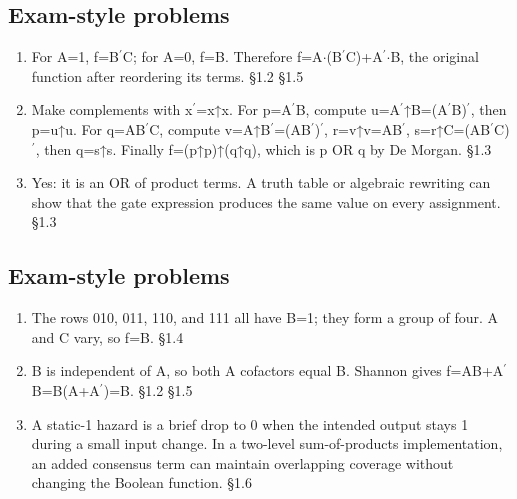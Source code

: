 \documentclass[11pt]{article}
\begin{document}
\begin{keepsection}\subsection{Exam-style problems}

\begin{enumerate}
\item For A=1, f=B\ensuremath{{}^{\prime}}C; for A=0, f=B. Therefore f=A\ensuremath{\cdot}(B\ensuremath{{}^{\prime}}C)+A\ensuremath{{}^{\prime}}\ensuremath{\cdot}B, the original function after reordering its terms. \hfill{\small\color{FAUblue}§1.2} \hfill{\small\color{FAUblue}§1.5}
\item Make complements with x\ensuremath{{}^{\prime}}=x↑x. For p=A\ensuremath{{}^{\prime}}B, compute u=A\ensuremath{{}^{\prime}}↑B=(A\ensuremath{{}^{\prime}}B)\ensuremath{{}^{\prime}}, then p=u↑u. For q=AB\ensuremath{{}^{\prime}}C, compute v=A↑B\ensuremath{{}^{\prime}}=(AB\ensuremath{{}^{\prime}})\ensuremath{{}^{\prime}}, r=v↑v=AB\ensuremath{{}^{\prime}}, s=r↑C=(AB\ensuremath{{}^{\prime}}C)\ensuremath{{}^{\prime}}, then q=s↑s. Finally f=(p↑p)↑(q↑q), which is p OR q by De Morgan. \hfill{\small\color{FAUblue}§1.3}
\item Yes: it is an OR of product terms. A truth table or algebraic rewriting can show that the gate expression produces the same value on every assignment. \hfill{\small\color{FAUblue}§1.3}
\end{enumerate}

\end{keepsection}
\begin{keepsection}\subsection{Exam-style problems}

\begin{enumerate}
\item The rows 010, 011, 110, and 111 all have B=1; they form a group of four. A and C vary, so f=B. \hfill{\small\color{FAUblue}§1.4}
\item B is independent of A, so both A cofactors equal B. Shannon gives f=AB+A\ensuremath{{}^{\prime}}B=B(A+A\ensuremath{{}^{\prime}})=B. \hfill{\small\color{FAUblue}§1.2} \hfill{\small\color{FAUblue}§1.5}
\item A static-1 hazard is a brief drop to 0 when the intended output stays 1 during a small input change. In a two-level sum-of-products implementation, an added consensus term can maintain overlapping coverage without changing the Boolean function. \hfill{\small\color{FAUblue}§1.6}
\end{enumerate}

\end{keepsection}
\end{document}
